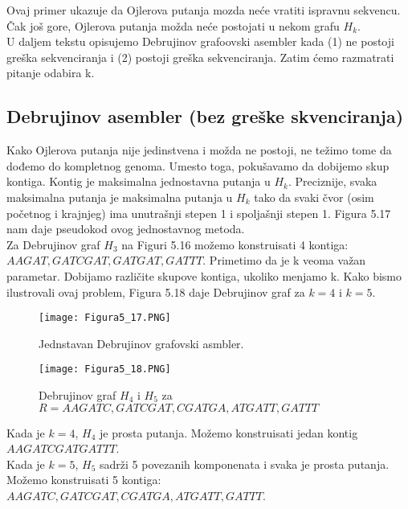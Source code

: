 \documentclass{article}
\begin{document}
Ovaj primer ukazuje da Ojlerova putanja mozda neće vratiti ispravnu sekvencu. Čak još gore, Ojlerova putanja možda neće postojati u nekom grafu $H_k$. \\

U daljem tekstu opisujemo Debrujinov grafoovski asembler kada (1) ne postoji greška sekvenciranja i (2) postoji greška sekvenciranja.
Zatim ćemo razmatrati pitanje odabira k. \\

\subsection{Debrujinov asembler (bez greške skvenciranja)}

Kako Ojlerova putanja nije jedinstvena i možda ne postoji, ne težimo tome da dođemo do kompletnog genoma. Umesto toga, pokušavamo da dobijemo skup kontiga. Kontig je maksimalna jednostavna putanja u $H_k$. Preciznije, svaka maksimalna putanja je maksimalna putanja u $H_k$ tako da svaki čvor (osim početnog i krajnjeg) ima unutrašnji stepen 1 i spoljašnji stepen 1. Figura 5.17 nam daje pseudokod ovog jednostavnog metoda.\\

Za Debrujinov graf $H_3$ na Figuri 5.16 možemo konstruisati 4 kontiga: $AAGAT, GATCGAT, GATGAT, GATTT$. Primetimo da je k veoma važan parametar. Dobijamo različite skupove kontiga, ukoliko menjamo k. Kako bismo ilustrovali ovaj problem, Figura 5.18 daje Debrujinov graf za $k = 4$ i $k = 5$.\\

\begin{figure}[h]
\centering
\texttt{[image: Figura5\_17.PNG]}
\caption{Jednstavan Debrujinov grafovski asmbler.}
\end{figure}

\begin{figure}[h]
\centering
\texttt{[image: Figura5\_18.PNG]}
\caption{Debrujinov graf $H_4$ i $H_5$ za $R = {AAGATC, GATCGAT, CGATGA, ATGATT, GATTT}$}
\end{figure}

Kada je $k = 4$, $H_4$ je prosta putanja. Možemo konstruisati jedan kontig $AAGATCGATGATTT$.\\

Kada je $k = 5$, $H_5$ sadrži 5 povezanih komponenata i svaka je prosta putanja.\\

Možemo konstruisati 5 kontiga: $AAGATC, GATCGAT, CGATGA, ATGATT, GATTT$. \\
\end{document}
